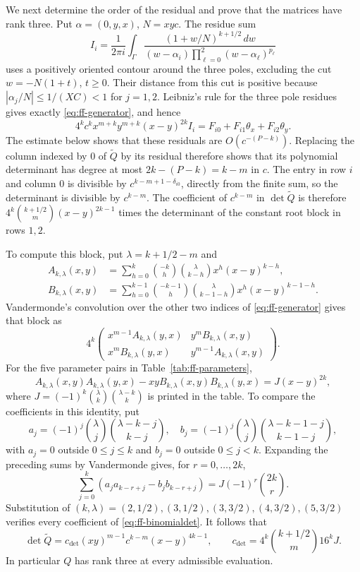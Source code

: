 \documentclass[12pt]{article}
\numberwithin{equation}{section}
\begin{document}
We next determine the order of the residual and prove that the matrices have rank three. Put
$\alpha=(0,y,x)$, $N=xyc$. The residue sum
\begin{equation}\label{eq:ff-residue}
 I_i=\frac1{2\pi i}\int_\Gamma
 \frac{(1+w/N)^{k+1/2}\,dw}
 {(w-\alpha_i)\prod_{\ell=0}^2(w-\alpha_\ell)^{p_\ell}}
\end{equation}
uses a positively oriented contour around the three poles, excluding
the cut $w=-N(1+t)$, $t\ge0$. Their distance from this cut is positive
because $|\alpha_j/N|\le1/(XC)<1$ for $j=1,2$.
Leibniz's rule for the three pole residues gives exactly
\eqref{eq:ff-generator}, and hence
\[
 4^k c^k x^{m+k}y^{m+k}(x-y)^{2k} I_i
 =F_{i0}+F_{i1}\theta_x+F_{i2}\theta_y.
\]
The estimate below shows that these residuals are $O(c^{-(P-k)})$.
Replacing the column indexed by $0$ of $\widetilde Q$ by its residual therefore shows
that its polynomial determinant has degree at most
$2k-(P-k)=k-m$ in $c$. The entry in row $i$ and column $0$ is divisible
by $c^{k-m+1-\delta_{i0}}$, directly from the finite sum, so
the determinant is divisible by $c^{k-m}$. The coefficient of $c^{k-m}$ in $\det\widetilde Q$ is therefore
$4^k\binom{k+1/2}{m}(x-y)^{2k-1}$ times the determinant of the
constant root block in rows $1,2$.

To compute this block, put
$\lambda=k+1/2-m$ and
\begin{align*}
 A_{k,\lambda}(x,y)&=\sum_{h=0}^k
   \binom{-k}{h}\binom{\lambda}{k-h}x^h(x-y)^{k-h},\\
 B_{k,\lambda}(x,y)&=\sum_{h=0}^{k-1}
   \binom{-k-1}{h}\binom{\lambda}{k-1-h}x^h(x-y)^{k-1-h}.
\end{align*}
Vandermonde's convolution over the other two indices of
\eqref{eq:ff-generator} gives that block as
\[
 4^k\begin{pmatrix}
 x^{m-1}A_{k,\lambda}(y,x)&y^mB_{k,\lambda}(x,y)\\
 x^mB_{k,\lambda}(y,x)&y^{m-1}A_{k,\lambda}(x,y)
 \end{pmatrix}.
\]
For the five parameter pairs in Table~\ref{tab:ff-parameters},
\begin{equation}\label{eq:ff-binomialdet}
 A_{k,\lambda}(x,y)A_{k,\lambda}(y,x)
 -xyB_{k,\lambda}(x,y)B_{k,\lambda}(y,x)
 =J(x-y)^{2k},
\end{equation}
where $J=(-1)^k\binom\lambda k\binom{\lambda-k}k$ is printed in the
table. To compare the coefficients in this identity, put
\[
 a_j=(-1)^j\binom\lambda j\binom{\lambda-k-j}{k-j},\quad
 b_j=(-1)^j\binom\lambda j\binom{\lambda-k-1-j}{k-1-j},
\]
with $a_j=0$ outside $0\le j\le k$ and $b_j=0$ outside
$0\le j<k$. Expanding the preceding sums by Vandermonde gives,
for $r=0,\ldots,2k$,
\[
 \sum_{j=0}^k(a_ja_{k-r+j}-b_jb_{k-r+j})
 =J(-1)^r\binom{2k}{r}.
\]
Substitution of $(k,\lambda)=(2,1/2),(3,1/2),(3,3/2),
(4,3/2),(5,3/2)$ verifies every coefficient of
\eqref{eq:ff-binomialdet}. It follows that
\begin{equation*}
 \det \widetilde Q=c_{\mathrm{det}}(xy)^{m-1}c^{k-m}(x-y)^{4k-1},\qquad
 c_{\mathrm{det}}=4^k\binom{k+1/2}{m}16^kJ.
\end{equation*}
In particular $Q$ has rank three at every admissible evaluation.
\end{document}
